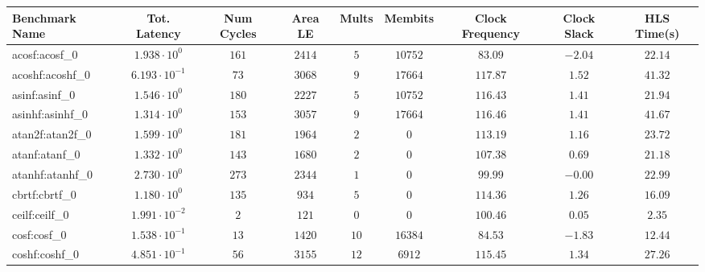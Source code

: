 \begin{tabular}{|l|c|c|c|c|c|c|c|c|}
\hline
Benchmark Name               & Tot. Latency            & Num Cycles & Area LE   & Mults   & Membits    & Clock Frequency & Clock Slack & HLS Time(s) \\
\hline
acosf:acosf\_0               & $ 1.938 \cdot 10^{0}  $ & $ 161    $ & $ 2414  $ & $ 5   $ & $ 10752  $ & $ 83.09       $ & $ -2.04   $ & $ 22.14   $ \\
acoshf:acoshf\_0             & $ 6.193 \cdot 10^{-1} $ & $ 73     $ & $ 3068  $ & $ 9   $ & $ 17664  $ & $ 117.87      $ & $ 1.52    $ & $ 41.32   $ \\
asinf:asinf\_0               & $ 1.546 \cdot 10^{0}  $ & $ 180    $ & $ 2227  $ & $ 5   $ & $ 10752  $ & $ 116.43      $ & $ 1.41    $ & $ 21.94   $ \\
asinhf:asinhf\_0             & $ 1.314 \cdot 10^{0}  $ & $ 153    $ & $ 3057  $ & $ 9   $ & $ 17664  $ & $ 116.46      $ & $ 1.41    $ & $ 41.67   $ \\
atan2f:atan2f\_0             & $ 1.599 \cdot 10^{0}  $ & $ 181    $ & $ 1964  $ & $ 2   $ & $ 0      $ & $ 113.19      $ & $ 1.16    $ & $ 23.72   $ \\
atanf:atanf\_0               & $ 1.332 \cdot 10^{0}  $ & $ 143    $ & $ 1680  $ & $ 2   $ & $ 0      $ & $ 107.38      $ & $ 0.69    $ & $ 21.18   $ \\
atanhf:atanhf\_0             & $ 2.730 \cdot 10^{0}  $ & $ 273    $ & $ 2344  $ & $ 1   $ & $ 0      $ & $ 99.99       $ & $ -0.00   $ & $ 22.99   $ \\
cbrtf:cbrtf\_0               & $ 1.180 \cdot 10^{0}  $ & $ 135    $ & $ 934   $ & $ 5   $ & $ 0      $ & $ 114.36      $ & $ 1.26    $ & $ 16.09   $ \\
ceilf:ceilf\_0               & $ 1.991 \cdot 10^{-2} $ & $ 2      $ & $ 121   $ & $ 0   $ & $ 0      $ & $ 100.46      $ & $ 0.05    $ & $ 2.35    $ \\
cosf:cosf\_0                 & $ 1.538 \cdot 10^{-1} $ & $ 13     $ & $ 1420  $ & $ 10  $ & $ 16384  $ & $ 84.53       $ & $ -1.83   $ & $ 12.44   $ \\
coshf:coshf\_0               & $ 4.851 \cdot 10^{-1} $ & $ 56     $ & $ 3155  $ & $ 12  $ & $ 6912   $ & $ 115.45      $ & $ 1.34    $ & $ 27.26   $ \\

\end{tabular}
